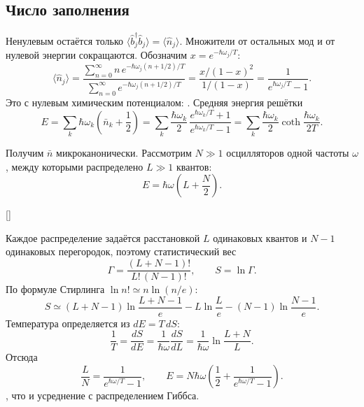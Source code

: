 \documentclass[../final.tex]{subfiles}
\begin{document}
\subsection*{Число заполнения}

Ненулевым остаётся только $\langle\hat b_j^\dagger\hat b_j\rangle=\langle\hat n_j\rangle$.
Множители от остальных мод и от нулевой энергии сокращаются.
Обозначим $x=e^{-\hbar\omega_j/T}$:
\[
    \langle\hat n_j\rangle
       =\frac{\sum_{n=0}^\infty n\,e^{-\hbar\omega_j(n+1/2)/T}}
             {\sum_{n=0}^\infty e^{-\hbar\omega_j(n+1/2)/T}}
       =\frac{x/(1-x)^2}{1/(1-x)}
       =\frac1{e^{\hbar\omega_j/T}-1}.
\]
Это  с нулевым химическим
потенциалом: .
Средняя энергия решётки
\[
    E=\sum_k\hbar\omega_k\left(\bar n_k+\frac12\right)
     =\sum_k\frac{\hbar\omega_k}2\,
        \frac{e^{\hbar\omega_k/T}+1}{e^{\hbar\omega_k/T}-1}
     =\sum_k\frac{\hbar\omega_k}2\coth\frac{\hbar\omega_k}{2T}.
\]


Получим $\bar n$ микроканонически. Рассмотрим $N\gg1$ осцилляторов
одной частоты $\omega$, между которыми распределено $L\gg1$ квантов:
\[
    E=\hbar\omega\left(L+\frac N2\right).
\]

\begin{rbox}[left=18pt,right=18pt,top=12pt,bottom=10pt]{[]}
\centering
{}
\end{rbox}

Каждое распределение задаётся расстановкой $L$ одинаковых квантов
и $N-1$ одинаковых перегородок, поэтому статистический вес
\[
    \Gamma=\frac{(L+N-1)!}{L!\,(N-1)!},\qquad S=\ln\Gamma.
\]
По формуле Стирлинга $\ln n!\simeq n\ln(n/e)$:
\[
    S\simeq(L+N-1)\ln\frac{L+N-1}{e}-L\ln\frac Le
       -(N-1)\ln\frac{N-1}{e}.
\]
Температура определяется из $dE=T\,dS$:
\[
    \frac1T=\frac{dS}{dE}=\frac1{\hbar\omega}\frac{dS}{dL}
       =\frac1{\hbar\omega}\ln\frac{L+N}{L}.
\]
Отсюда
\[
    \frac LN=\frac1{e^{\hbar\omega/T}-1},\qquad
    E=N\hbar\omega\left(\frac12+\frac1{e^{\hbar\omega/T}-1}\right).
\]
, что и усреднение с распределением Гиббса.
\end{document}
